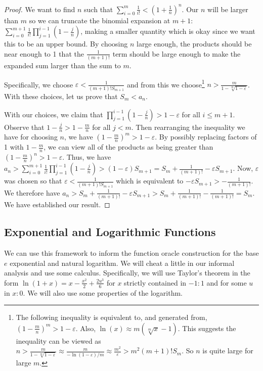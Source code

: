 \documentclass[12pt]{article}
\begin{document}
\begin{proof}
 We want to find $n$ such that $\sum_{i=0}^m \frac{1}{i!} < (1+\frac{1}{n})^n$. Our $n$ will be larger than $m$ so we can truncate the binomial expansion at $m+1$: $\sum_{i=0}^{m+1} \frac{1}{i!} \prod_{j=1}^{i-1} (1-\tfrac{j}{n})$, making a smaller quantity which is okay since we want this to be an upper bound. By choosing $n$ large enough, the products should be near enough to 1 that the $\frac{1}{(m+1)!}$ term should be large enough to make the expanded sum larger than the sum to $m$. 

 Specifically, we choose $\varepsilon < \frac{1}{(m+1)! S_{m+1}  }$ and from this we choose\footnote{The  following inequality is equivalent to, and generated from, $(1-\tfrac{m}{n})^m > 1 - \varepsilon$. Also, $\ln(x) \approx m (\sqrt[m]{x} -1)$. This suggests the inequality can be viewed as $n > \frac{m}{1 - \sqrt[m]{1-\varepsilon}} \approx \frac{m}{-\ln(1 - \varepsilon)/m} \approx \frac{m^2}{\varepsilon} > m^2 (m+1)! S_m$. So $n$ is quite large for large $m$.}  $n > \frac{m}{ 1 - \sqrt[m]{1-\varepsilon}}$. With these choices, let us prove that $S_m < a_n$. 
 
 With our choices, we claim that $\prod_{j=1}^{i-1} (1-\tfrac{j}{n}) > 1-\varepsilon$ for all $i \leq m+1$. Observe that $1-\tfrac{j}{n} > 1 -\tfrac{m}{n}$ for all $j < m$. Then rearranging the inequality we have for choosing $n$, we have $(1 - \tfrac{m}{n})^m > 1 - \varepsilon $. By possibly replacing factors of 1 with $1-\tfrac{m}{n}$, we can view all of the products as being greater than $(1 - \tfrac{m}{n})^n > 1-\varepsilon$.  Thus, we have 
 $a_n >  \sum_{i=0}^{m+1} \frac{1}{i!} \prod_{j=1}^{i-1} (1-\tfrac{j}{n}) > (1-\varepsilon) S_{m+1} = S_m + \frac{1}{(m+1)!} - \varepsilon S_{m+1}$.  Now, $\varepsilon$ was chosen so that $\varepsilon < \frac{1}{(m+1)! S_{m+1}}$ which is equivalent to $- \varepsilon S_{m+1} > -\frac{1}{(m+1)!}$. We therefore have $a_n > S_m + \frac{1}{(m+1)!} - \varepsilon S_{m+1} > S_m + \frac{1}{(m+1)!} - \frac{1}{(m+1)!} = S_m$. We have established our result. 
\end{proof}


\subsection{Exponential and Logarithmic Functions}

We can use this framework to inform the function oracle construction for the base $e$ exponential and natural logarithm. We will cheat a little in our informal analysis and use some calculus. Specifically, we will use Taylor's theorem in the form $\ln(1+x) = x - \frac{x^2}{2} + \frac{2u^3}{6}$ for $x$ strictly contained in $-1:1$ and for some $u$ in $x:0$. We will also use some properties of the logarithm. 
\end{document}
